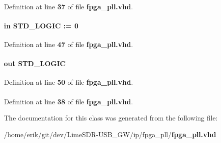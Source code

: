 \paragraph[{ieee}]{\hspace{0.3cm}{\ttfamily [Library]}}\label{classfpga__pll_a0a6af6eef40212dbaf130d57ce711256}


Definition at line {\bf 37} of file {\bf fpga\+\_\+pll.\+vhd}.

\paragraph[{inclk0}]{ {\bfseries \textcolor{keywordflow}{in}\textcolor{vhdlchar}{ }} {\bfseries \textcolor{comment}{S\+T\+D\+\_\+\+L\+O\+G\+IC}\textcolor{vhdlchar}{ }\textcolor{vhdlchar}{ }\textcolor{vhdlchar}{\+:}\textcolor{vhdlchar}{=}\textcolor{vhdlchar}{ }\textcolor{vhdlchar}{ }\textcolor{vhdlchar}{\textquotesingle{}}\textcolor{vhdlchar}{ } \textcolor{vhdldigit}{0} \textcolor{vhdlchar}{ }\textcolor{vhdlchar}{\textquotesingle{}}\textcolor{vhdlchar}{ }} \hspace{0.3cm}{\ttfamily [Port]}}\label{classfpga__pll_a9463f4cc62782c2faac516c942dcb5db}


Definition at line {\bf 47} of file {\bf fpga\+\_\+pll.\+vhd}.

\paragraph[{locked}]{ {\bfseries \textcolor{keywordflow}{out}\textcolor{vhdlchar}{ }} {\bfseries \textcolor{comment}{S\+T\+D\+\_\+\+L\+O\+G\+IC}\textcolor{vhdlchar}{ }} \hspace{0.3cm}{\ttfamily [Port]}}\label{classfpga__pll_ab33e72e8245db404191648e9a25344eb}


Definition at line {\bf 50} of file {\bf fpga\+\_\+pll.\+vhd}.

\paragraph[{std\+\_\+logic\+\_\+1164}]{\hspace{0.3cm}{\ttfamily [Package]}}\label{classfpga__pll_acd03516902501cd1c7296a98e22c6fcb}


Definition at line {\bf 38} of file {\bf fpga\+\_\+pll.\+vhd}.



The documentation for this class was generated from the following file\+:\begin{DoxyCompactItemize}
\item 
/home/erik/git/dev/\+Lime\+S\+D\+R-\/\+U\+S\+B\+\_\+\+G\+W/ip/fpga\+\_\+pll/{\bf fpga\+\_\+pll.\+vhd}\end{DoxyCompactItemize}
